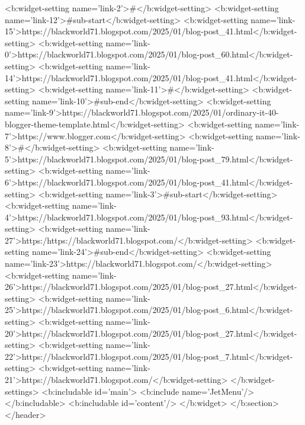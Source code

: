 {{{{      <b:widget-setting name='link-2'>#</b:widget-setting>
      <b:widget-setting name='link-12'>#sub-start</b:widget-setting>
      <b:widget-setting name='link-15'>https://blackworld71.blogspot.com/2025/01/blog-post_41.html</b:widget-setting>
      <b:widget-setting name='link-0'>https://blackworld71.blogspot.com/2025/01/blog-post_60.html</b:widget-setting>
      <b:widget-setting name='link-14'>https://blackworld71.blogspot.com/2025/01/blog-post_41.html</b:widget-setting>
      <b:widget-setting name='link-11'>#</b:widget-setting>
      <b:widget-setting name='link-10'>#sub-end</b:widget-setting>
      <b:widget-setting name='link-9'>https://blackworld71.blogspot.com/2025/01/ordinary-it-40-blogger-theme-template.html</b:widget-setting>
      <b:widget-setting name='link-7'>https://www.blogger.com</b:widget-setting>
      <b:widget-setting name='link-8'>#</b:widget-setting>
      <b:widget-setting name='link-5'>https://blackworld71.blogspot.com/2025/01/blog-post_79.html</b:widget-setting>
      <b:widget-setting name='link-6'>https://blackworld71.blogspot.com/2025/01/blog-post_41.html</b:widget-setting>
      <b:widget-setting name='link-3'>#sub-start</b:widget-setting>
      <b:widget-setting name='link-4'>https://blackworld71.blogspot.com/2025/01/blog-post_93.html</b:widget-setting>
      <b:widget-setting name='link-27'>https:/https://blackworld71.blogspot.com/</b:widget-setting>
      <b:widget-setting name='link-24'>#sub-end</b:widget-setting>
      <b:widget-setting name='link-23'>https://blackworld71.blogspot.com/</b:widget-setting>
      <b:widget-setting name='link-26'>https://blackworld71.blogspot.com/2025/01/blog-post_27.html</b:widget-setting>
      <b:widget-setting name='link-25'>https://blackworld71.blogspot.com/2025/01/blog-post_6.html</b:widget-setting>
      <b:widget-setting name='link-20'>https://blackworld71.blogspot.com/2025/01/blog-post_27.html</b:widget-setting>
      <b:widget-setting name='link-22'>https://blackworld71.blogspot.com/2025/01/blog-post_7.html</b:widget-setting>
      <b:widget-setting name='link-21'>https://blackworld71.blogspot.com/</b:widget-setting>
    </b:widget-settings>
    <b:includable id='main'>
      <b:include name='JetMenu'/>
    </b:includable>
    <b:includable id='content'/>
  </b:widget>
</b:section>
</header>


}}}}

